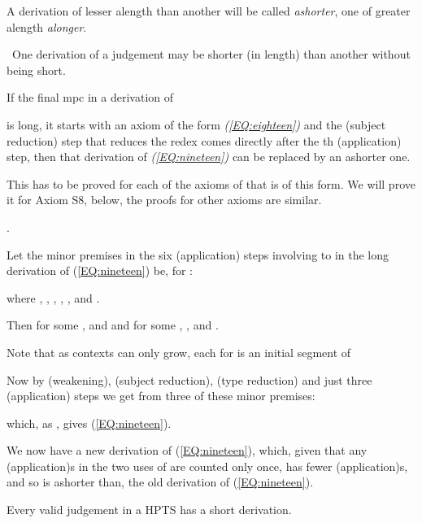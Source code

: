 \documentclass{LMCS}
\begin{document}
\begin{thm}
{\begin{defi}
  A derivation of lesser alength than another will be called
  \emph{ashorter}, one of greater alength \emph{alonger}.
\end{defi}

 \ One derivation of a judgement may be shorter
  (in length) than another without being short.

\begin{lem}\label{L:twenty} If the final mpc in a derivation of

  is long, it starts with an axiom of the form
  \emph{(\ref{EQ:eighteen})} and the (subject reduction) step that
  reduces the  redex comes directly after the th
  (application) step, then that derivation of
  \emph{(\ref{EQ:nineteen})} can be replaced by an ashorter one.
\end{lem}

\proof This has to be proved for each of the axioms of 
  that is of this form. We will prove it for Axiom {S8}, below, the
  proofs for other axioms are similar.
\bigskip

\quad 


\noindent\phantom{\bf{S8}[}\quad
\hfill

\noindent{}\quad


\noindent\phantom{\bf{S8}[}\quad
.
\bigskip

 \noindent Let the minor premises in the six (application) steps
 involving  to  in the long derivation of
 (\ref{EQ:nineteen}) be, for :

  where , , , , ,
   and .

  Then for some ,  and
   and for some , ,  and .

  Note that as contexts can only grow, each  for  is an initial segment of 

  Now by (weakening), (subject reduction), (type reduction) and just
  three (application) steps we get from three of these minor premises:

  which, as , gives
  (\ref{EQ:nineteen}).

  We now have a new derivation of (\ref{EQ:nineteen}), which, given
  that any (application)s in the two uses of 
  are counted only once, has fewer (application)s, and so is ashorter
  than, the old derivation of (\ref{EQ:nineteen}).

\begin{lem}\label{L:twentyone}
  Every valid judgement in a HPTS has a short derivation.
\end{lem}

}
\end{thm}
\end{document}
